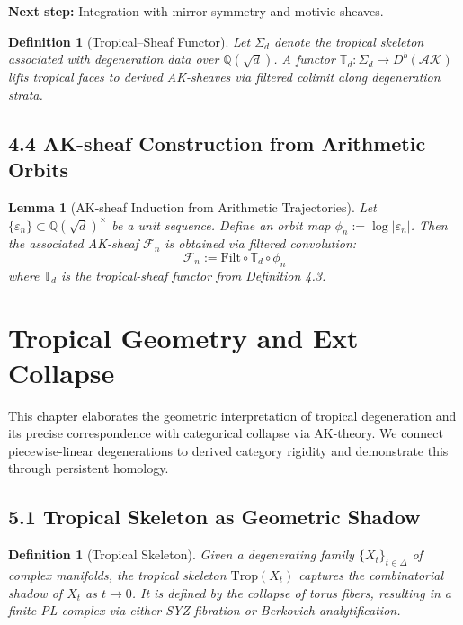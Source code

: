 \documentclass[11pt]{article}
\newtheorem{definition}[theorem]{Definition}
\newtheorem{lemma}[theorem]{Lemma}
\begin{document}
\textbf{Next step:} Integration with mirror symmetry and motivic sheaves.

\begin{definition}[Tropical--Sheaf Functor]
Let $\Sigma_d$ denote the tropical skeleton associated with degeneration data over $\mathbb{Q}(\sqrt{d})$.
A functor $\mathbb{T}_d : \Sigma_d \to D^b(\mathcal{AK})$ lifts tropical faces to derived AK-sheaves via filtered colimit along degeneration strata.
\end{definition}

\subsection{4.4 AK-sheaf Construction from Arithmetic Orbits}

\begin{lemma}[AK-sheaf Induction from Arithmetic Trajectories]
Let $\{\varepsilon_n\} \subset \mathbb{Q}(\sqrt{d})^\times$ be a unit sequence.
Define an orbit map $\phi_n := \log|\varepsilon_n|$.
Then the associated AK-sheaf $\mathcal{F}_n$ is obtained via filtered convolution:
\[
\mathcal{F}_n := \mathrm{Filt} \circ \mathbb{T}_d \circ \phi_n
\]
where $\mathbb{T}_d$ is the tropical-sheaf functor from Definition 4.3.
\end{lemma}


\section{Tropical Geometry and Ext Collapse}

This chapter elaborates the geometric interpretation of tropical degeneration and its precise correspondence with categorical collapse via AK-theory. We connect piecewise-linear degenerations to derived category rigidity and demonstrate this through persistent homology.

\subsection{5.1 Tropical Skeleton as Geometric Shadow}

\begin{definition}[Tropical Skeleton]
Given a degenerating family $\{ X_t \}_{t \in \Delta}$ of complex manifolds, the tropical skeleton $\mathrm{Trop}(X_t)$ captures the combinatorial shadow of $X_t$ as $t \to 0$. It is defined by the collapse of torus fibers, resulting in a finite PL-complex via either SYZ fibration or Berkovich analytification.
\end{definition}
\end{document}

